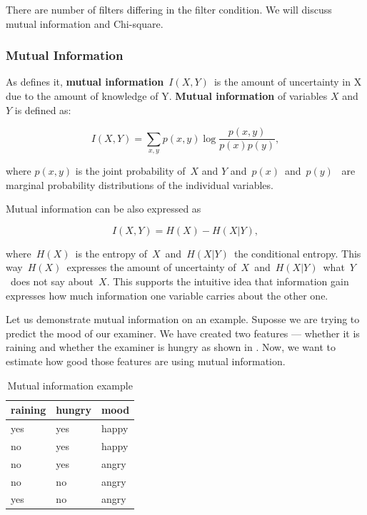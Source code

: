 There are number of filters differing in the filter condition.
We will discuss mutual information and Chi-square.

\subsubsection{Mutual Information}
\label{subsubsec:mi}
As \citet{Hoq14} defines it,
{\bf mutual information}~$I(X, Y)$~is the amount of uncertainty in X due to the amount of knowledge of Y.
{\bf Mutual information} of variables $X$ and $Y$ is defined as:

\begin{equation}
I(X,Y) = \sum_{x,y} p\left(x,y\right)
\log
\frac{p\left(x,y\right)}{p\left(x\right)p\left(y\right)},
\label{eq:mi}
\end{equation}

where $p\left(x, y\right)$ is the joint probability of~$X$ and $Y$ and~$p(x)$~and~$p(y)$~
are marginal probability distributions of the individual variables.

Mutual information can be also expressed as

\begin{equation}
	I(X, Y) = H(X) - H(X|Y),
\end{equation}


where~$H(X)$~is the entropy of~$X$~and~$H(X|Y)$~the conditional entropy.
This way~$H(X)$~expresses the amount of uncertainty of~$X$~and~$H(X|Y)$~what~$Y$~does not say about~$X$.
This supports the intuitive idea that information gain expresses how much information one variable carries about the other one.

Let us demonstrate mutual information on an example.
Suposse we are trying to predict the mood of our examiner.
We have created two features --- whether it is raining and whether the examiner is hungry as shown in .
Now, we want to estimate how good those features are using mutual information.


\begin{table}[h!]
 \center
 \begin{tabular}{lll}
	\toprule
	 \textbf{raining} & \textbf{hungry} & \textbf{mood} \\ 
	 \midrule
	 yes & yes & happy \\
	 no & yes & happy \\
	 no & yes & angry \\
	 no & no & angry \\
	 yes  & no & angry \\
	 \bottomrule
 \end{tabular}
 \caption{Mutual information example}
 \label{tab:mi_ex}
\end{table}

